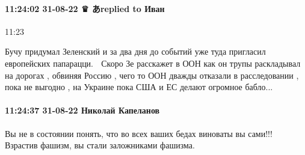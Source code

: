 \paragraph{11:24:02 31-08-22 ♛ あreplied to Иван}
11:23

Бучу придумал Зеленский и за два дня до событий уже туда пригласил европейских
папарацци. 🤣 Скоро Зе расскажет в ООН как он трупы раскладывал на дорогах ,
обвиняя Россию , чего то ООН дважды отказали в расследовании , пока не выгодно
, на Украине пока США и ЕС делают огромное бабло...

\paragraph{11:24:37 31-08-22 Николай Капеланов}

Вы не в состоянии понять, что во всех ваших бедах виноваты вы сами!!! Взрастив
фашизм, вы стали заложниками фашизма.
